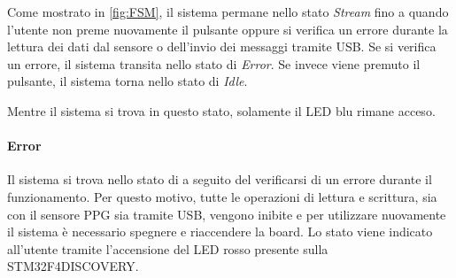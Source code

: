 Come mostrato in \Fig\ref{fig:FSM}, il sistema permane nello stato \textit{Stream} fino a quando l'utente non preme nuovamente il pulsante oppure si verifica un errore durante la lettura dei dati dal sensore o dell'invio dei messaggi tramite USB. Se si verifica un errore, il sistema transita nello stato di \textit{Error}. Se invece viene premuto il pulsante, il sistema torna nello stato di \textit{Idle}.

Mentre il sistema si trova in questo stato, solamente il LED blu rimane acceso.

\paragraph{Error} Il sistema si trova nello stato di  a seguito del verificarsi di un errore durante il funzionamento. Per questo motivo, tutte le operazioni di lettura e scrittura, sia con il sensore PPG sia tramite USB, vengono inibite e per utilizzare nuovamente il sistema è necessario spegnere e riaccendere la board. Lo stato viene indicato all'utente tramite l'accensione del LED rosso presente sulla STM32F4DISCOVERY. 

\clearpage